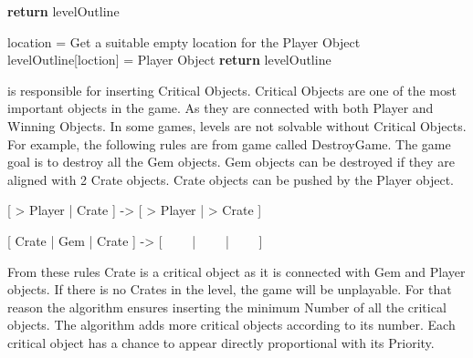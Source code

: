 \begin{algorithm}[H]
	\BlankLine
	\BlankLine
	\BlankLine
	\textbf{return} levelOutline\;
	\caption{Winning Objects Insertion Algorithm}
	\label{Algorithm:winningObjects}
\end{algorithm}

\begin{algorithm}[H]
	\BlankLine
	location = Get a suitable empty location for the Player Object\;
	levelOutline[loction] = Player Object\;
	\BlankLine
	\textbf{return} levelOutline\;
	\caption{Player Object Insertion Algorithm}
	\label{Algorithm:playerObject}
\end{algorithm}

 is responsible for inserting Critical Objects. Critical Objects are one of the most important objects in the game. As they are connected with both Player and Winning Objects. In some games, levels are not solvable without Critical Objects. For example, the following rules are from game called DestroyGame. The game goal is to destroy all the Gem objects. Gem objects can be destroyed if they are aligned with 2 Crate objects. Crate objects can be pushed by the Player object.
\begin{center} [ > Player | Crate ] -> [ > Player | > Crate ]\end{center}
\begin{center} [ Crate | Gem | Crate ] -> [ \ \ \ \ | \ \ \ \ | \ \ \ \ ]\end{center}
From these rules Crate is a critical object as it is connected with Gem and Player objects. If there is no Crates in the level, the game will be unplayable. For that reason the algorithm ensures inserting the minimum Number of all the critical objects. The algorithm adds more critical objects according to its number. Each critical object has a chance to appear directly proportional with its Priority.\\

